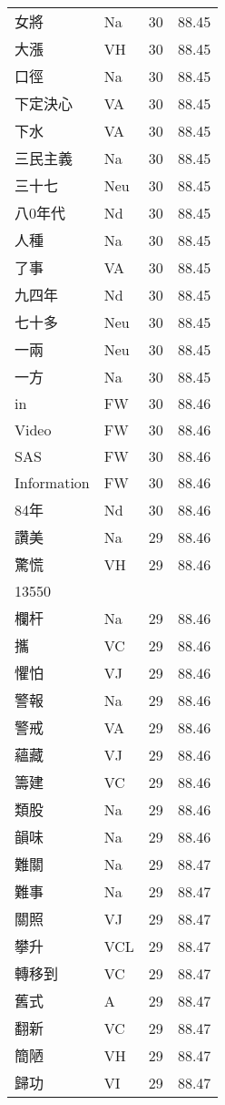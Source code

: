 \documentclass[twocolumn]{book}
\begin{document}
\begin{supertabular}{llrr}
女將 & Na & 30 &  88.45\\
大漲 & VH & 30 &  88.45\\
口徑 & Na & 30 &  88.45\\
下定決心 & VA & 30 &  88.45\\
下水 & VA & 30 &  88.45\\
三民主義 & Na & 30 &  88.45\\
三十七 & Neu & 30 &  88.45\\
八0年代 & Nd & 30 &  88.45\\
人種 & Na & 30 &  88.45\\
了事 & VA & 30 &  88.45\\
九四年 & Nd & 30 &  88.45\\
七十多 & Neu & 30 &  88.45\\
一兩 & Neu & 30 &  88.45\\
一方 & Na & 30 &  88.45\\
in & FW & 30 &  88.46\\
Video & FW & 30 &  88.46\\
SAS & FW & 30 &  88.46\\
Information & FW & 30 &  88.46\\
84年 & Nd & 30 &  88.46\\
讚美 & Na & 29 &  88.46\\
驚慌 & VH & 29 &  88.46\\
13550\\
欄杆 & Na & 29 &  88.46\\
攜 & VC & 29 &  88.46\\
懼怕 & VJ & 29 &  88.46\\
警報 & Na & 29 &  88.46\\
警戒 & VA & 29 &  88.46\\
蘊藏 & VJ & 29 &  88.46\\
籌建 & VC & 29 &  88.46\\
類股 & Na & 29 &  88.46\\
韻味 & Na & 29 &  88.46\\
難關 & Na & 29 &  88.47\\
難事 & Na & 29 &  88.47\\
關照 & VJ & 29 &  88.47\\
攀升 & VCL & 29 &  88.47\\
轉移到 & VC & 29 &  88.47\\
舊式 & A & 29 &  88.47\\
翻新 & VC & 29 &  88.47\\
簡陋 & VH & 29 &  88.47\\
歸功 & VI & 29 &  88.47\\

\end{supertabular}
\end{document}
